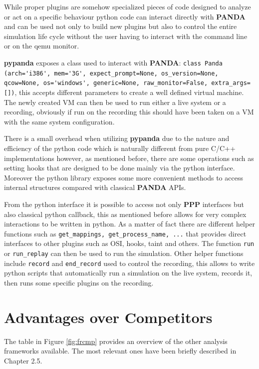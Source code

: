 While proper plugins are somehow specialized pieces of code designed to analyze or act on a specific behaviour python code can interact directly with \textbf{PANDA} and can be used not only to build new plugins but also to control the entire simulation life cycle without the user having to interact with the command line or on the qemu monitor.

\textbf{pypanda} exposes a class used to interact with \textbf{PANDA}: \lstinline{class Panda (arch='i386', mem='3G', expect_prompt=None, os_version=None, qcow=None, os='windows', generic=None, raw_monitor=False, extra_args=[])}, this accepts different parameters to create a well defined virtual machine. The newly created VM can then be used to run either a live system or a recording, obviously if run on the recording this should have been taken on a VM with the same system configuration. 

There is a small overhead when utilizing \textbf{pypanda} due to the nature and efficiency of the python code which is naturally different from pure C/C++ implementations however, as mentioned before, there are some operations such as setting hooks that are designed to be done mainly via the python interface. Moreover the python library exposes some more convenient methods to access internal structures compared with classical \textbf{PANDA} APIs. 

From the python interface it is possible to access not only \textbf{PPP} interfaces but also classical python callback, this as mentioned before allows for very complex interactions to be written in python. As a matter of fact there are different helper functions such as \lstinline{get_mappings, get_process_name, ...} that provides direct interfaces to other plugins such as OSI, hooks, taint and others. The function \lstinline{run} or \lstinline{run_replay} can then be used to run the simulation. Other helper functions include \lstinline{record} and \lstinline{end_record} used to control the recording, this allows to write python scripts that automatically run a simulation on the live system, records it, then runs some specific plugins on the recording. 

\section{Advantages over Competitors}

The table in Figure \ref{fig:frcmp} provides an overview of the other analysis frameworks available. The most relevant ones have been briefly described in Chapter 2.5. 

